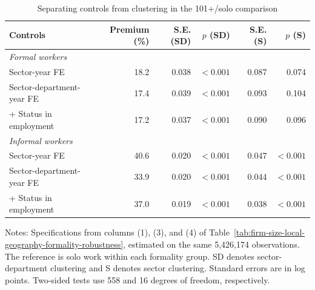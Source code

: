 \begin{table}[htbp]
  \centering
  \caption{Separating controls from clustering in the 101+/solo comparison}
  \label{tab:preferred-clustering-sensitivity}
  \scriptsize
  \begin{tabular}{lrrrrr}
    \toprule
    Controls & Premium (\%) & S.E. (SD) & $p$ (SD) & S.E. (S) & $p$ (S) \\
    \midrule
    \multicolumn{6}{l}{\textit{Formal workers}} \\
    Sector-year FE & 18.2 & 0.038 & $<0.001$ & 0.087 & 0.074 \\
    Sector-department-year FE & 17.4 & 0.039 & $<0.001$ & 0.093 & 0.104 \\
    + Status in employment & 17.2 & 0.037 & $<0.001$ & 0.090 & 0.096 \\
    \midrule
    \multicolumn{6}{l}{\textit{Informal workers}} \\
    Sector-year FE & 40.6 & 0.020 & $<0.001$ & 0.047 & $<0.001$ \\
    Sector-department-year FE & 33.9 & 0.020 & $<0.001$ & 0.044 & $<0.001$ \\
    + Status in employment & 37.0 & 0.019 & $<0.001$ & 0.038 & $<0.001$ \\
    \bottomrule
  \end{tabular}
  \vspace{0.3em}
  \begin{minipage}{0.95\textwidth}
  \footnotesize
  Notes: Specifications from columns (1), (3), and (4) of Table~\ref{tab:firm-size-local-geography-formality-robustness}, estimated on the same 5,426,174 observations. The reference is solo work within each formality group. SD denotes sector-department clustering and S denotes sector clustering. Standard errors are in log points. Two-sided tests use 558 and 16 degrees of freedom, respectively.
  \end{minipage}
\end{table}
